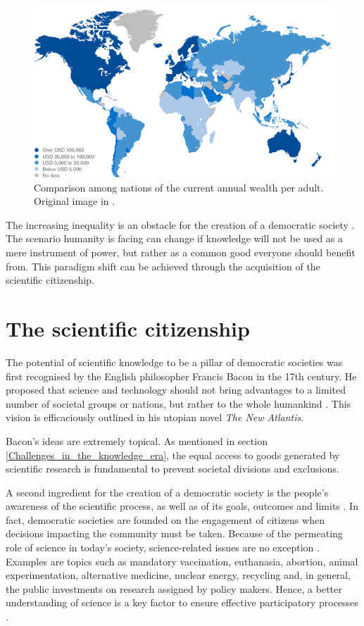 \begin{figure}[!t] 
 \begin{center}
 \includegraphics[scale=0.44]{Images/World_wealth_levels.png}
 \caption{Comparison among nations of the current annual wealth per adult. Original image in \cite{Kersley}.}
 \label{World_wealth_levels}
 \end{center}
\end{figure}

The increasing inequality is an obstacle for the creation of a democratic society \cite{Mckenna}. The scenario humanity is facing can change if knowledge will not be used as a mere instrument of power, but rather as a common good everyone should benefit from. This paradigm shift can be achieved through the acquisition of the scientific citizenship.

\section{The scientific citizenship} \label{The_scientific_citizenship}
The potential of scientific knowledge to be a pillar of democratic societies was first recognised by the English philosopher Francis Bacon in the 17th century. He proposed that science and technology should not bring advantages to a limited number of societal groups or nations, but rather to the whole humankind \cite{Zagorin}. This vision is efficaciously outlined in his utopian novel \textit{The New Atlantis}.

Bacon's ideas are extremely topical. As mentioned in section \ref{Challenges_in_the_knowledge_era}, the equal access to goods generated by scientific research is fundamental to prevent societal divisions and exclusions.

A second ingredient for the creation of a democratic society is the people's awareness of the scientific process, as well as of its goals, outcomes and limits \cite{Gibbons}. In fact, democratic societies are founded on the engagement of citizens when decisions impacting the community must be taken. Because of the permeating role of science in today's society, science-related issues are no exception \cite{vanDijck}. Examples are topics such as mandatory vaccination, euthanasia, abortion, animal experimentation, alternative medicine, nuclear energy, recycling and, in general, the public investments on research assigned by policy makers. Hence, a better understanding of science is a key factor to ensure effective participatory processes \cite{Shapin}.    

